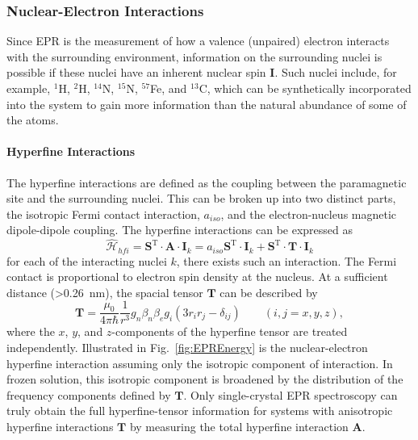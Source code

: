 \subsubsection*{Nuclear-Electron Interactions}
Since EPR is the measurement of how a valence (unpaired) electron interacts with the surrounding environment, information on the surrounding nuclei is possible if these nuclei have an inherent nuclear spin $\mathbf{I}$. Such nuclei include, for example, $^1$H, $^2$H, $^{14}$N, $^{15}$N, $^{57}$Fe, and $^{13}$C, which can be synthetically incorporated into the system to gain more information than the natural abundance of some of the atoms. \cite{Doorslaer2007,Harmer2009,CUTSAIL20151370}

\paragraph*{Hyperfine Interactions}
The hyperfine interactions are defined as the coupling between the paramagnetic site and the surrounding nuclei. This can be broken up into two distinct parts, the isotropic Fermi contact interaction, $a_{iso}$, and the electron-nucleus magnetic dipole-dipole coupling. The hyperfine interactions can be expressed as
\begin{equation}
    \hat{\mathcal{H}}_{hfi} = \mathbf{S}^{\text{T}} \cdot \mathbf{A} \cdot \mathbf{I}_k = a_{iso}\mathbf{S}^{\text{T}} \cdot \mathbf{I}_k + \mathbf{S}^{\text{T}} \cdot \mathbf{T} \cdot \mathbf{I}_k \label{eq-2:hfi}
\end{equation}
for each of the interacting nuclei $k$, there exists such an interaction. The Fermi contact is proportional to electron spin density at the nucleus. At a sufficient distance (>0.26~nm), the spacial tensor $\mathbf{T}$ can be described by
\begin{equation}
    \mathbf{T} = \frac{\mu_0}{4 \pi \hbar}\frac{1}{r^3} g_n \beta_n \beta_e g_i (3r_i r_j - \delta_{ij}) \qquad (i,j = x,y,z), \label{eq-2:hfiT}
\end{equation}
where the $x$, $y$, and $z$-components of the hyperfine tensor are treated independently.\cite{Doorslaer2007} Illustrated in Fig.~\ref{fig:EPREnergy} is the nuclear-electron hyperfine interaction assuming only the isotropic component of interaction. In frozen solution, this isotropic component is broadened by the distribution of the frequency components defined by $\mathbf{T}$. Only single-crystal EPR spectroscopy can truly obtain the full hyperfine-tensor information for systems with anisotropic hyperfine interactions $\mathbf{T}$ by measuring the total hyperfine interaction $\mathbf{A}$.

